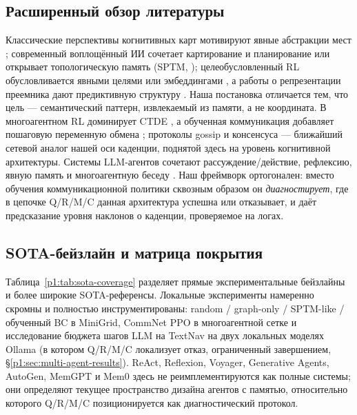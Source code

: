 \documentclass{article}
\begin{document}
\subsection{Расширенный обзор литературы}
\label{p1:app:related-work-extended}

Классические перспективы когнитивных карт мотивируют явные абстракции мест \citep{tolman1948cognitive,okeefe1978hippocampus,kuipers2000spatial}; современный воплощённый ИИ сочетает картирование и планирование \citep{gupta2017cognitive} или открывает топологическую память (SPTM, \citealp{savinov2018semi}); целеобусловленный RL обусловливается явными целями или эмбеддингами \citep{andrychowicz2017hindsight,ghosh2021learning}, а работы о репрезентации преемника дают предиктивную структуру \citep{dayan1993improving,stachenfeld2017hippocampus,momennejad2017successor}. Наша постановка отличается тем, что цель --- семантический паттерн, извлекаемый из памяти, а не координата. В многоагентном RL доминирует CTDE \citep{lowe2017maddpg,foerster2018ctde}, а обученная коммуникация добавляет пошаговую переменную обмена \citep{sukhbaatar2016commnet,foerster2016learning}; протоколы gossip и консенсуса \citep{boyd2006gossip,xiao2007distributed} --- ближайший сетевой аналог нашей оси каденции, поднятой здесь на уровень когнитивной архитектуры. Системы LLM-агентов сочетают рассуждение/действие, рефлексию, явную память и многоагентную беседу \citep{yao2022react,shinn2023reflexion,wang2023voyager,park2023generative,wu2023autogen,packer2023memgpt,chhikara2025mem0}. Наш фреймворк ортогонален: вместо обучения коммуникационной политики сквозным образом он \emph{диагностирует}, где в цепочке Q/R/M/C данная архитектура успешна или отказывает, и даёт предсказание уровня наклонов о каденции, проверяемое на логах.

\subsection{SOTA-бейзлайн и матрица покрытия}
\label{p1:app:sota-coverage}

Таблица~\ref{p1:tab:sota-coverage} разделяет прямые экспериментальные бейзлайны и более широкие SOTA-референсы. Локальные эксперименты намеренно скромны и полностью инструментированы: random / graph-only / SPTM-like / обученный BC в MiniGrid, CommNet PPO в многоагентной сетке и исследование бюджета шагов LLM на TextNav на двух локальных моделях Ollama (в котором Q/R/M/C локализует отказ, ограниченный завершением, \S\ref{p1:sec:multi-agent-results}). ReAct, Reflexion, Voyager, Generative Agents, AutoGen, MemGPT и Mem0 здесь не реимплементируются как полные системы; они определяют текущее пространство дизайна агентов с памятью, относительно которого Q/R/M/C позиционируется как диагностический протокол.
\end{document}
